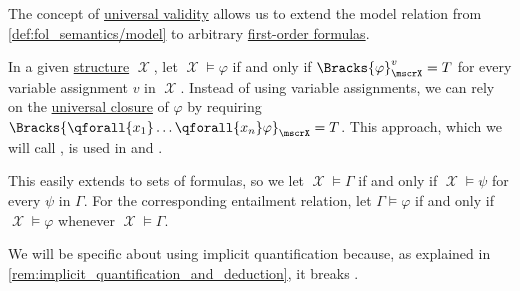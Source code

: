 \begin{definition}\label{def:fol_implicit_universal_quantification}\mimprovised
  The concept of \hyperref[def:fol_universal_validity]{universal validity} allows us to extend the model relation from \cref{def:fol_semantics/model} to arbitrary \hyperref[def:fol_formula]{first-order formulas}.

  In a given \hyperref[def:fol_structure]{structure} \( \mscrX \), let \( \mscrX \vDash \varphi \) if and only if \( \Bracks{\varphi}_\mscrX^v = T \) for every variable assignment \( v \) in \( \mscrX \). Instead of using variable assignments, we can rely on the \hyperref[def:fol_quantifier_closure]{universal closure} of \( \varphi \) by requiring \( \Bracks{\qforall {x_1} \ldots \qforall {x_n} \varphi}_\mscrX = T \). This approach, which we will call , is used in \cite[def. 2.2.1]{Hinman2005Logic} and \cite[94]{Герасимов2014Вычислимость}.

  This easily extends to sets of formulas, so we let \( \mscrX \vDash \Gamma \) if and only if \( \mscrX \vDash \psi \) for every \( \psi \) in \( \Gamma \). For the corresponding entailment relation, let \( \Gamma \vDash \varphi \) if and only if \( \mscrX \vDash \varphi \) whenever \( \mscrX \vDash \Gamma \).
\end{definition}
\begin{comments}
  \item We will be specific about using implicit quantification because, as explained in \cref{rem:implicit_quantification_and_deduction}, it breaks .
\end{comments}

